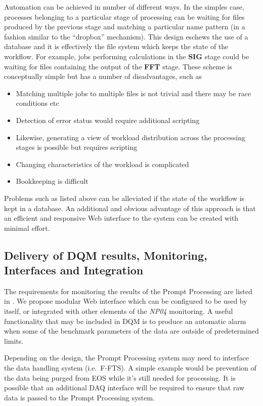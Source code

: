 \documentclass[pdftex,12pt,letter]{article}
\newcommand{\expname}{\textit{NP04}\xspace}
\newcommand{\PP}{Prompt Processing\xspace}
\begin{document}
Automation can be achieved in  number of different ways. In the simples case, processes belonging to a particular stage
of processing can be waiting for files produced by the previous stage and matching a particular name pattern
(in a fashion similar to the ``dropbox'' mechanism). This design eschews the use of a database and it is effectively
the file system which keeps the state of the workflow. For example, jobs performing calculations in the \textbf{SIG}
stage could be waiting for files containing the output of the \textbf{FFT} stage. These scheme is conceptually simple but has a number of
disadvantages, such as
\begin{itemize}
\item Matching multiple jobs to multiple files is not trivial and there may be race conditions etc
\item Detection of error status would require additional scripting
\item Likewise, generating a view of workload distribution across the processing stages is possible but requires
scripting
\item Changing characteristics of the workload is complicated
\item Bookkeeping is difficult
\end{itemize}

\noindent Problems such as listed above can be alleviated if the state of the workflow is kept in a database.
An additional and obvious advantage of this approach is that an efficient and responsive Web interface to
the system can be created with minimal effort.

\subsection{Delivery of DQM results, Monitoring, Interfaces and Integration}

The requirements for monitoring the results of the \PP are listed in \cite{docdb1811}.
We propose modular Web interface which can be configured to be used by itself, or integrated
with other elements of the \expname monitoring. A useful functionality that may be included in DQM
is to produce an automatic alarm when some of the benchmark parameters of the data are outside
of predetermined limits.

Depending on the design, the \PP system may need to interface the data handling system (i.e.~F-FTS).
A simple example would be prevention of the data being purged from EOS while it's still needed for processing.
It is possible that an additional DAQ interface will be required to ensure that raw data is passed to the
\PP system.
\end{document}
